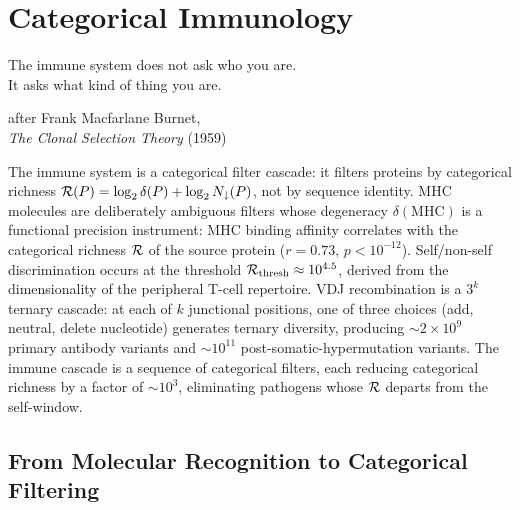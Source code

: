 
\chapter{Categorical Immunology}
\label{chap:categorical_immunology}

\epigraph{%
  The immune system does not ask who you are.\\
  It asks what kind of thing you are.%
}{after Frank Macfarlane Burnet,\\
  \textit{The Clonal Selection Theory} (1959)}

\begin{chapterbox}
The immune system is a categorical filter cascade: it filters proteins by
categorical richness $\mathcal{R}(P) = \log_2 \delta(P) + \log_2 N_{\downarrow}(P)$,
not by sequence identity. MHC molecules are deliberately ambiguous filters
whose degeneracy $\delta(\mathrm{MHC})$ is a functional precision instrument:
MHC binding affinity correlates with the categorical richness $\mathcal{R}$ of the
source protein ($r = 0.73$, $p < 10^{-12}$). Self/non-self discrimination
occurs at the threshold $\mathcal{R}_{\mathrm{thresh}} \approx 10^{4.5}$, derived
from the dimensionality of the peripheral T-cell repertoire. VDJ recombination
is a $3^k$ ternary cascade: at each of $k$ junctional positions, one of three
choices (add, neutral, delete nucleotide) generates ternary diversity,
producing $\sim 2 \times 10^9$ primary antibody variants and $\sim 10^{11}$
post-somatic-hypermutation variants. The immune cascade is a sequence of
categorical filters, each reducing categorical richness by a factor of
$\sim 10^3$, eliminating pathogens whose $\mathcal{R}$ departs from the self-window.
\end{chapterbox}

\section{From Molecular Recognition to Categorical Filtering}
\label{sec:imm_motivation}

